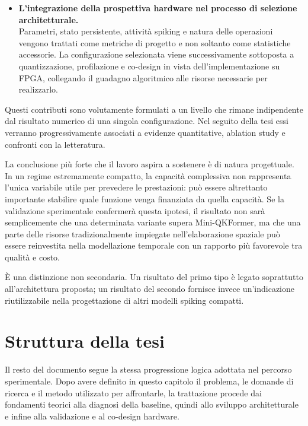 \begin{itemize}
    \item \textbf{L'integrazione della prospettiva hardware nel processo di selezione architetturale.} \\
    Parametri, stato persistente, attività spiking e natura delle operazioni vengono trattati come metriche di progetto e non soltanto come statistiche accessorie. La configurazione selezionata viene successivamente sottoposta a quantizzazione, profilazione e co-design in vista dell'implementazione su FPGA, collegando il guadagno algoritmico alle risorse necessarie per realizzarlo.
\end{itemize}

Questi contributi sono volutamente formulati a un livello che rimane indipendente dal risultato numerico di una singola configurazione. Nel seguito della tesi essi verranno progressivamente associati a evidenze quantitative, ablation study e confronti con la letteratura.

La conclusione più forte che il lavoro aspira a sostenere è di natura progettuale. In un regime estremamente compatto, la capacità complessiva non rappresenta l'unica variabile utile per prevedere le prestazioni: può essere altrettanto importante stabilire quale funzione venga finanziata da quella capacità. Se la validazione sperimentale confermerà questa ipotesi, il risultato non sarà semplicemente che una determinata variante supera Mini-QKFormer, ma che una parte delle risorse tradizionalmente impiegate nell'elaborazione spaziale può essere reinvestita nella modellazione temporale con un rapporto più favorevole tra qualità e costo.

È una distinzione non secondaria. Un risultato del primo tipo è legato soprattutto all'architettura proposta; un risultato del secondo fornisce invece un'indicazione riutilizzabile nella progettazione di altri modelli spiking compatti.




\section{Struttura della tesi}
\label{sec:struttura_tesi}

Il resto del documento segue la stessa progressione logica adottata nel percorso sperimentale. Dopo avere definito in questo capitolo il problema, le domande di ricerca e il metodo utilizzato per affrontarle, la trattazione procede dai fondamenti teorici alla diagnosi della baseline, quindi allo sviluppo architetturale e infine alla validazione e al co-design hardware.

